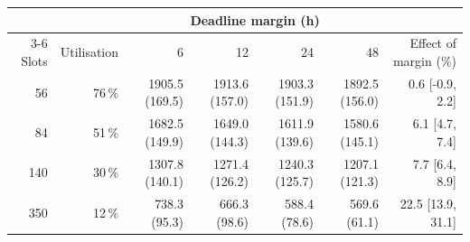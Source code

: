 \begin{tabular}{rrrrrrr}
\toprule
& & \multicolumn{4}{c}{Deadline margin (h)} & \\
\cmidrule(lr){3-6}
Slots & Utilisation & 6 & 12 & 24 & 48 & Effect of margin (\%) \\
\midrule
56 & 76\,\% & 1905.5 (169.5) & 1913.6 (157.0) & 1903.3 (151.9) & 1892.5 (156.0) & 0.6 [-0.9, 2.2] \\
84 & 51\,\% & 1682.5 (149.9) & 1649.0 (144.3) & 1611.9 (139.6) & 1580.6 (145.1) & 6.1 [4.7, 7.4] \\
140 & 30\,\% & 1307.8 (140.1) & 1271.4 (126.2) & 1240.3 (125.7) & 1207.1 (121.3) & 7.7 [6.4, 8.9] \\
350 & 12\,\% & 738.3 (95.3) & 666.3 (98.6) & 588.4 (78.6) & 569.6 (61.1) & 22.5 [13.9, 31.1] \\
\bottomrule
\end{tabular}
